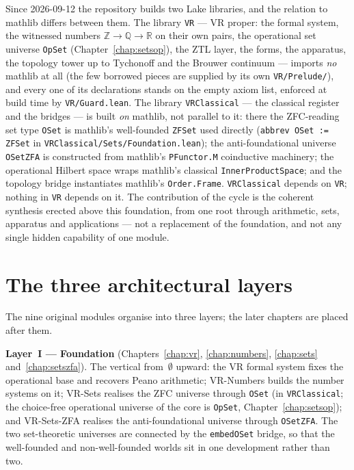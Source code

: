 Since 2026-09-12 the repository builds two Lake libraries, and the
relation to mathlib differs between them.  The library \texttt{VR} --- VR
proper: the formal system, the witnessed numbers
$\mathbb{Z}\to\mathbb{Q}\to\mathbb{R}$ on their own pairs, the
operational set universe \texttt{OpSet} (Chapter~\ref{chap:setsop}), the
ZTL layer, the forms, the apparatus, the topology tower up to Tychonoff and
the Brouwer continuum --- imports \emph{no} mathlib at all (the few
borrowed pieces are supplied by its own \texttt{VR/Prelude/}), and every one
of its declarations stands on the empty axiom list, enforced at build time
by \texttt{VR/Guard.lean}.  The library \texttt{VRClassical} --- the
classical register and the bridges --- is built \emph{on} mathlib, not
parallel to it: there the ZFC-reading set type \texttt{OSet} is mathlib's
well-founded \texttt{ZFSet} used directly (\texttt{abbrev OSet := ZFSet}
in \texttt{VRClassical/Sets/Foundation.lean}); the anti-foundational
universe \texttt{OSetZFA} is constructed from mathlib's \texttt{PFunctor.M}
coinductive machinery; the operational Hilbert space wraps mathlib's
classical \texttt{InnerProductSpace}; and the topology bridge instantiates
mathlib's \texttt{Order.Frame}.  \texttt{VRClassical} depends on
\texttt{VR}; nothing in \texttt{VR} depends on it.  The
contribution of the cycle is the coherent synthesis erected above this
foundation, from one root through arithmetic, sets, apparatus and
applications --- not a replacement of the foundation, and not any single
hidden capability of one module.

\section{The three architectural layers}
\label{sec:overview_layers}

The nine original modules organise into three layers; the later
chapters are placed after them.

\textbf{Layer~I --- Foundation} (Chapters~\ref{chap:vr}, \ref{chap:numbers},
\ref{chap:sets} and~\ref{chap:setszfa}).  The vertical from~$\emptyset$
upward: the VR formal system fixes the operational base and recovers Peano
arithmetic; VR-Numbers builds the number systems on it; VR-Sets realises
the ZFC universe through \texttt{OSet} (in \texttt{VRClassical}; the
choice-free operational universe of the core is \texttt{OpSet},
Chapter~\ref{chap:setsop}); and VR-Sets-ZFA realises the
anti-foundational universe through \texttt{OSetZFA}.  The two set-theoretic
universes are connected by the \texttt{embedOSet} bridge, so that the
well-founded and non-well-founded worlds sit in one development rather than
two.

